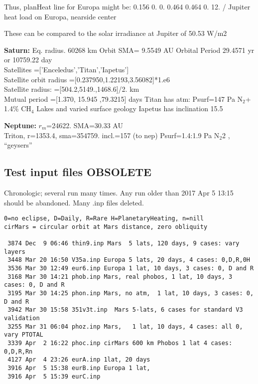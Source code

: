 \documentclass{article}
\begin{document}

Thus, planHeat line for Europa might be:
  0.156 0.  0.  0.464 0.464 0.  12. / Jupiter heat load on Europa, nearside center

These can be compared to the solar irradiance at Jupiter of 50.53 W/m2

\textbf{Saturn:} Eq. radius.  60268  km
\qi Orbit SMA= 9.5549  AU
\qi Orbital Period 29.4571 yr or 10759.22  day 
\\ Satellites =['Enceledus','Titan','Iapetus']
\\ Satellite orbit radius =[0.237950,1.22193,3.56082]*1.e6
\\ Satellite radius: =[504.2,5149.,1468.6]/2.  km 
\\ Mutual period =[1.370, 15.945 ,79.3215] days
\qi Titan has atm: Psurf=147 Pa N$_2$+ 1.4\% CH$_4$ 
\qii Lakes and varied surface geology
\qi Iapetus has inclination 15.5\qd

\textbf{Neptune:} $r_m$=24622. SMA=30.33 AU
\\ Triton, r=1353.4, sma=354759.  incl.=157 (to nep)
\qi Psurf=1.4:1.9 Pa N$_2$2 , ``geysers''

\subsection{Test input files  OBSOLETE}
Chronologic; several run many times. Any run older than 2017 Apr 5 13:15 should be abandoned. Many .inp files deleted.
\vspace{-3.mm} 
\begin{verbatim}
0=no eclipse, D=Daily, R=Rare H=PlanetaryHeating, n=nill 
cirMars = circular orbit at Mars distance, zero obliquity

 3874 Dec  9 06:46 thin9.inp Mars  5 lats, 120 days, 9 cases: vary layers
 3448 Mar 20 16:50 V35a.inp Europa 5 lats, 20 days, 4 cases: 0,D,R,0H
 3536 Mar 30 12:49 eur6.inp Europa 1 lat, 10 days, 3 cases: 0, D and R
 3168 Mar 30 14:21 phob.inp Mars, real phobos, 1 lat, 10 days, 3 cases: 0, D and R
 3195 Mar 30 14:25 phon.inp Mars, no atm,  1 lat, 10 days, 3 cases: 0, D and R
 3942 Mar 30 15:58 351v3t.inp  Mars 5-lats, 6 cases for standard V3 validation
 3255 Mar 31 06:04 phoz.inp Mars,   1 lat, 10 days, 4 cases: all 0, vary PTOTAL
 3339 Apr  2 16:22 phoc.inp cirMars 600 km Phobos 1 lat 4 cases: 0,D,R,Rn
 4127 Apr  4 23:26 eurA.inp 1lat, 20 days 
 3916 Apr  5 15:38 eurB.inp Europa 1 lat,
 3916 Apr  5 15:39 eurC.inp
\end{verbatim}
\end{document}

